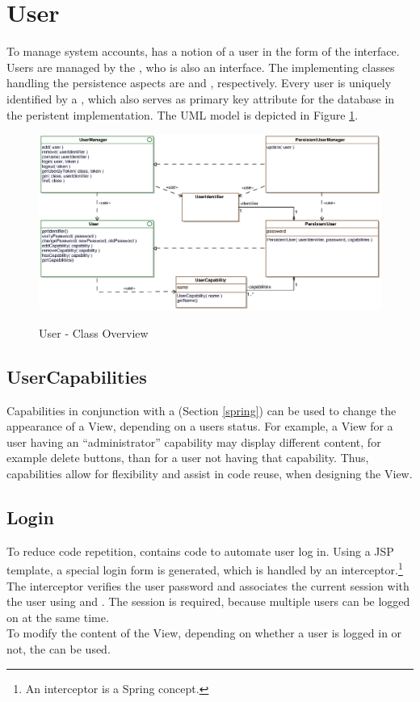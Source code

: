 \section{User}
\label{sec:user}
To manage system accounts, \salespoint{} has a notion of a user in the form of the  interface.
Users are managed by the , who is also an interface.
The implementing classes handling the persistence aspects are  and , respectively.
Every user is uniquely identified by a , which also serves as primary key attribute for the database in the peristent implementation.
The UML model is depicted in Figure \ref{user_overview}.\\

\begin{figure}
	\centering
  \includegraphics[width=1.0\textwidth]{images/User_Overview.eps}
	\label{user_overview}
	\caption{User - Class Overview}
\end{figure}

\subsection*{UserCapabilities}
Capabilities in conjunction with a  (Section \ref{spring}) can be used to change the appearance of a View, depending on a users status.
For example, a View for a user having an ``administrator'' capability may display different content, for example delete buttons, than for a user not having that capability.
Thus, capabilities allow for flexibility and assist in code reuse, when designing the View.

\subsection*{Login}
To reduce code repetition, \salespoint{} contains code to automate user log in.
Using a JSP template, a special login form is generated, which is handled by an interceptor.\footnote{An interceptor is a Spring concept.}
The interceptor verifies the user password and associates the current session with the user using  and .
The session is required, because multiple users can be logged on at the same time.\\

To modify the content of the View, depending on whether a user is logged in or not, the  can be used.
